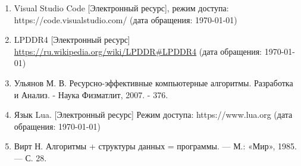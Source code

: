 
\begin{enumerate}
    \item Visual Studio Code [Электронный ресурс], режим доступа: https://code.visualstudio.com/ (дата обращения: \today)
	\item LPDDR4 [Электронный ресурс] \url{https://ru.wikipedia.org/wiki/LPDDR#LPDDR4} (дата обращения: \today)
	\item Ульянов М. В. Ресурсно-эффективные компьютерные алгоритмы. Разработка и Анализ. - Наука Физматлит, 2007. - 376.
	\item Язык Lua. [Электронный ресурс] Режим доступа: https://www.lua.org (дата обращения: \today)
	\item Вирт Н. Алгоритмы + структуры данных = программы. — М.: «Мир», 1985. — С. 28.
\end{enumerate}


